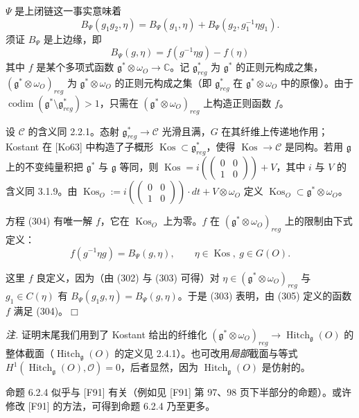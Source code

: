$\Psi$ 是上闭链这一事实意味着
\begin{equation}\tag{303}
B_\Psi(g_1g_2,\eta)=B_\Psi(g_1,\eta)+B_\Psi(g_2,g_1^{-1}\eta g_1).
\end{equation}
须证 $B_\Psi$ 是上边缘，即
\begin{equation}\tag{304}
B_\Psi(g,\eta)=f(g^{-1}\eta g)-f(\eta)
\end{equation}
其中 $f$ 是某个多项式函数 $\mathfrak{g}^*\otimes\omega_O\to\mathbb{C}$。记 $\mathfrak{g}^*_{reg}$ 为 $\mathfrak{g}^*$ 的正则元构成之集，$(\mathfrak{g}^*\otimes\omega_O)_{reg}$ 为 $\mathfrak{g}^*\otimes\omega_O$ 的正则元构成之集（即 $\mathfrak{g}^*_{reg}$ 在 $\mathfrak{g}^*\otimes\omega_O$ 中的原像）。由于 $\operatorname{codim}(\mathfrak{g}^*\setminus\mathfrak{g}^*_{reg})>1$，只需在 $(\mathfrak{g}^*\otimes\omega_O)_{reg}$ 上构造正则函数 $f$。

设 $\mathcal{C}$ 的含义同 2.2.1。态射 $\mathfrak{g}^*_{reg}\to\mathcal{C}$ 光滑且满，$G$ 在其纤维上传递地作用；Kostant 在 [Ko63] 中构造了子概形 $\operatorname{Kos}\subset\mathfrak{g}^*_{reg}$，使得 $\operatorname{Kos}\to\mathcal{C}$ 是同构。若用 $\mathfrak{g}$ 上的不变纯量积把 $\mathfrak{g}^*$ 与 $\mathfrak{g}$ 等同，则 $\operatorname{Kos}=i\left(\begin{pmatrix}0&0\\1&0\end{pmatrix}\right)+V$，其中 $i$ 与 $V$ 的含义同 3.1.9。由 $\operatorname{Kos}_O:=i\left(\begin{pmatrix}0&0\\1&0\end{pmatrix}\right)\cdot dt+V\otimes\omega_O$ 定义 $\operatorname{Kos}_O\subset\mathfrak{g}^*\otimes\omega_O$。

方程 (304) 有唯一解 $f$，它在 $\operatorname{Kos}_O$ 上为零。$f$ 在 $(\mathfrak{g}^*\otimes\omega_O)_{reg}$ 上的限制由下式定义：
\begin{equation}\tag{305}
f(g^{-1}\eta g)=B_\Psi(g,\eta),\qquad \eta\in\operatorname{Kos},\ g\in G(O).
\end{equation}

这里 $f$ 良定义，因为（由 (302) 与 (303) 可得）对 $\eta\in(\mathfrak{g}^*\otimes\omega_O)_{reg}$ 与 $g_1\in C(\eta)$ 有 $B_\Psi(g_1g,\eta)=B_\Psi(g,\eta)$。于是 (303) 表明，由 (305) 定义的函数 $f$ 满足 (304)。\hfill$\Box$

\emph{注.} 证明末尾我们用到了 Kostant 给出的纤维化 $(\mathfrak{g}^*\otimes\omega_O)_{reg}\to\operatorname{Hitch}_{\mathfrak{g}}(O)$ 的整体截面（$\operatorname{Hitch}_{\mathfrak{g}}(O)$ 的定义见 2.4.1）。也可改用\emph{局部}截面与等式 $H^1(\operatorname{Hitch}_{\mathfrak{g}}(O),\mathcal{O})=0$，后者显然，因为 $\operatorname{Hitch}_{\mathfrak{g}}(O)$ 是仿射的。

 命题 6.2.4 似乎与 [F91] 有关（例如见 [F91] 第 97、98 页下半部分的命题）。或许修改 [F91] 的方法，可得到命题 6.2.4 乃至更多。
